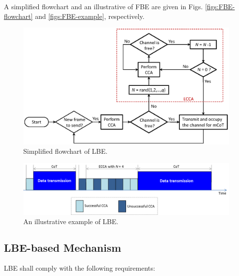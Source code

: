 A simplified flowchart and an illustrative of FBE are given in Figs. \ref{figs:FBE-flowchart} and \ref{figs:FBE-example}, respectively.


\begin{figure}[!t]
	\centering
	\includegraphics[width=0.9\columnwidth]{figs/LBE-flowchart}
	\caption{Simplified flowchart of LBE.}
	\label{figs:LBE-flowchart}
\end{figure}

\begin{figure}[!t]
	\centering
	\includegraphics[width=0.9\columnwidth]{figs/LBE-example}
	\caption{An illustrative example of LBE.}
	\label{figs:LBE-example}
\end{figure}


\subsection{LBE-based Mechanism}
\label{etsi-lbt:lbe}

LBE shall comply with the following requirements:

